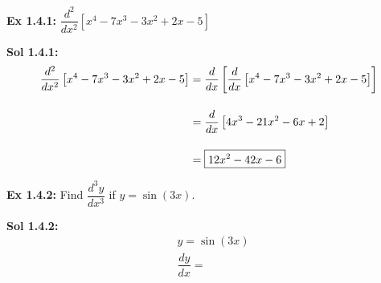 \begin{tcolorbox}[example]
    \textbf{Ex 1.4.1: } $\dfrac{d^2}{dx^2} \left[x^4 - 7x^3 - 3x^2 + 2x - 5\right]$
\end{tcolorbox}
\begin{tcolorbox}[solution]
    \textbf{Sol 1.4.1: } \begin{align*}
        \dfrac{d^2}{dx^2} \left[x^4 - 7x^3 - 3x^2 + 2x - 5\right] &= \dfrac{d}{dx} \left[\dfrac{d}{dx} \left[x^4 - 7x^3 - 3x^2 + 2x - 5\right]\right] \\[11pt]
        & = \dfrac{d}{dx} \left[4x^3 - 21x^2 - 6x + 2\right] \\[11pt]
        & = \boxed{12x^2 - 42x - 6}
    \end{align*}
\end{tcolorbox} \vspace{11pt}

\begin{tcolorbox}[example]
    \textbf{Ex 1.4.2: } Find $\dfrac{d^3y}{dx^3}$ if $y = \sin (3x)$.
\end{tcolorbox} 
\begin{tcolorbox}[solution]
    \textbf{Sol 1.4.2: } \begin{align*}
        & y = \sin (3x) \\[11pt]
        & \dfrac{dy}{dx} = 
    \end{align*}
\end{tcolorbox}